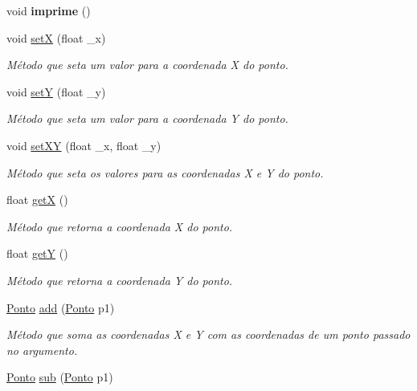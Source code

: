 \begin{DoxyCompactItemize}
\mbox{\label{classPonto_a84758d453e38f237bdf860b6435e9def}} 
void {\bfseries imprime} ()
\item 
void \mbox{\hyperlink{classPonto_a22129ad4dbf8019c479021d70a9f6774}{setX}} (float \+\_\+x)
\begin{DoxyCompactList}\small\item\em Método que seta um valor para a coordenada X do ponto. \end{DoxyCompactList}\item 
void \mbox{\hyperlink{classPonto_a2d9e5b9fade9d3f3f21122a2dc2f5e11}{setY}} (float \+\_\+y)
\begin{DoxyCompactList}\small\item\em Método que seta um valor para a coordenada Y do ponto. \end{DoxyCompactList}\item 
void \mbox{\hyperlink{classPonto_a827488219a7da184d440f687cec49ce6}{set\+XY}} (float \+\_\+x, float \+\_\+y)
\begin{DoxyCompactList}\small\item\em Método que seta os valores para as coordenadas X e Y do ponto. \end{DoxyCompactList}\item 
float \mbox{\hyperlink{classPonto_ae4823d6ee26ff3448ee403d26a3c6d2f}{getX}} ()
\begin{DoxyCompactList}\small\item\em Método que retorna a coordenada X do ponto. \end{DoxyCompactList}\item 
float \mbox{\hyperlink{classPonto_ab120600953e6544301223b9b05a43ee5}{getY}} ()
\begin{DoxyCompactList}\small\item\em Método que retorna a coordenada Y do ponto. \end{DoxyCompactList}\item 
\mbox{\hyperlink{classPonto}{Ponto}} \mbox{\hyperlink{classPonto_abb68d6122278de262e8ed1c70714e3d9}{add}} (\mbox{\hyperlink{classPonto}{Ponto}} p1)
\begin{DoxyCompactList}\small\item\em Método que soma as coordenadas X e Y com as coordenadas de um ponto passado no argumento. \end{DoxyCompactList}\item 
\mbox{\hyperlink{classPonto}{Ponto}} \mbox{\hyperlink{classPonto_a8404fcad0fca2ce768ab9e1550f5d3a0}{sub}} (\mbox{\hyperlink{classPonto}{Ponto}} p1)

\end{DoxyCompactItemize}
